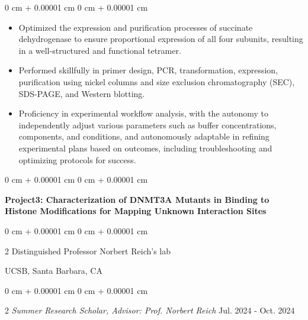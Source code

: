 \documentclass[10pt, letterpaper]{article}
\newenvironment{highlights}{
    \begin{itemize}[
        topsep=0.10 cm,
        parsep=0.10 cm,
        partopsep=0pt,
        itemsep=0pt,
        leftmargin=0 cm + 10pt
    ]
}{
    \end{itemize}
} %
\newenvironment{onecolentry}{
    \begin{adjustwidth}{
        0 cm + 0.00001 cm
    }{
        0 cm + 0.00001 cm
    }
}{
    \end{adjustwidth}
} %
\newenvironment{twocolentry}[2][]{
    \onecolentry
    \def\secondColumn{#2}
    \setcolumnwidth{\fill, 4.5 cm}
    \begin{paracol}{2}
}{
    \switchcolumn \raggedleft \secondColumn
    \end{paracol}
    \endonecolentry
} %
\begin{document}
        \vspace{0.10 cm}
        \begin{onecolentry}
            \begin{highlights}
                \item Optimized the expression and purification processes of succinate dehydrogenase to ensure proportional expression of all four subunits, resulting in a well-structured and functional tetramer.
                \item Performed skillfully in primer design, PCR, transformation, expression, purification using nickel columns and size exclusion chromatography (SEC), SDS-PAGE, and Western blotting.
                \item Proficiency in experimental workflow analysis, with the autonomy to independently adjust various parameters such as buffer concentrations, components, and conditions, and autonomously adaptable in refining experimental plans based on outcomes, including troubleshooting and optimizing protocols for success.
            \end{highlights}
        \end{onecolentry}


        \vspace{0.2 cm}

        \begin{onecolentry}
        \setlength{\fontsize}{10.5pt}{14pt}\selectfont \textbf{Project3: Characterization of DNMT3A Mutants in Binding to Histone Modifications for Mapping Unknown Interaction Sites}
        \end{onecolentry}
\vspace{0.1 cm}
        \begin{twocolentry}{
            \normalsize UCSB, Santa Barbara, CA
        }{Distinguished Professor Norbert Reich's lab
             }
             \end{twocolentry}
\vspace{0.1 cm}
        \begin{twocolentry}{
            \normalsize Jul. 2024 - Oct. 2024
        }{
           {\emph{Summer Research Scholar, Advisor: Prof. Norbert Reich}}} \end{twocolentry}
\end{document}
